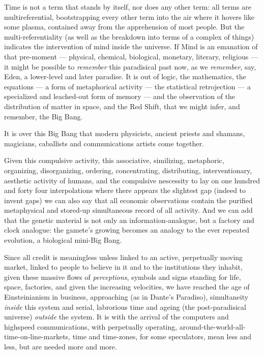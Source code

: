 Time is not a term that stands by itself, nor does any other term: all terms are multireferential, bootstrapping every other term into the air where it hovers like some plasma, contained away from the apprehension of most people. But the multi-referentiality (as well as the breakdown into terms of a complex of things) indicates the intervention of mind inside the universe. If Mind is an emanation of that pre-moment --- physical, chemical, biological, monetary, literary, religious --- it might be possible to \emph{remember} this paradisical past now, as we \emph{remember}, say, Eden, a lower-level and later paradise. It is out of logic, the mathematics, the equations --- a form of metaphorical activity --- the statistical retrojection --- a specialized and leached-out form of memory --- and the observation of the distribution of matter in space, and the Red Shift, that we might infer, and remember, the Big Bang.

It is over this Big Bang that modern physicists, ancient priests and shamans, magicians, caballists and communications artists come together.

Given this compulsive activity, this associative, similizing, metaphoric, organizing, disorganizing, ordering, concentrating, distributing, interventionary, aesthetic activity of humans, and the compulsive nescessity to lay on one hundred and forty four interpolations where there appears the slightest gap (indeed to invent gaps) we can also say that all economic observations contain the purified metaphysical and stored-up simultaneous record of all activity. And we can add that the genetic material is not only an information-analogue, but a factory and clock analogue: the gamete's growing becomes an analogy to the ever repeated evolution, a biological mini-Big Bang.

Since all credit is meaningless unless linked to an active, perpetually moving market, linked to people to believe in it and to the institutions they inhabit, given these massive flows of \emph{perceptions}, symbols and signs standing for life, space, factories, and given the increasing velocities, we have reached the age of Einsteinianism in business, approaching (as in Dante's Paradiso), simultaneity \emph{inside} this system and serial, labrorious time and ageing (the post-paradisical universe) \emph{outside} the system. It is with the arrival of the computers and highspeed communications, with perpetually operating, around-the-world-all-time-on-line-markets, time and time-zones, for some speculators, mean less and less, but are needed more and more.

